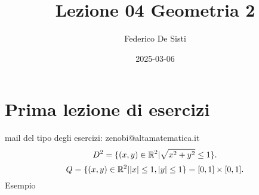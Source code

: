 \documentclass[12px]{article}
\title{Lezione 04 Geometria 2}
\date{2025-03-06}
\author{Federico De Sisti}
\begin{document}
	\maketitle
	\newpage
	\section{Prima lezione di esercizi}
	mail del tipo degli esercizi: zenobi@altamatematica.it
	\[
	 D^2 = \{(x,y)\in\mathbb{R}^2 | \sqrt {x^2 + y^2 }\leq 1\}
	.\] 
	\[
		Q = \{(x,y)\in\mathbb{R}^2 | |x|\leq 1, |y|\leq 1\} = [0,1]\times[0,1]
	.\] 
	Esempio 
\end{document}
